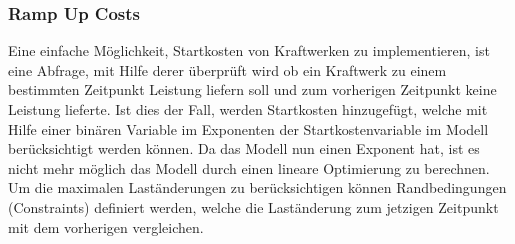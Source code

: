 \documentclass{eegreport}
\begin{document}
\subsubsection{Ramp Up Costs}
Eine einfache Möglichkeit, Startkosten von Kraftwerken zu implementieren, ist eine Abfrage, mit Hilfe derer
überprüft wird ob ein Kraftwerk zu einem bestimmten Zeitpunkt Leistung liefern soll und zum vorherigen
Zeitpunkt keine Leistung lieferte.
Ist dies der Fall, werden Startkosten hinzugefügt, welche mit Hilfe einer binären Variable im Exponenten der
Startkostenvariable im Modell berücksichtigt werden können. Da das Modell nun einen Exponent hat, ist es nicht mehr möglich das Modell durch einen lineare Optimierung zu berechnen.
Um die maximalen Laständerungen zu berücksichtigen können Randbedingungen (Constraints) definiert werden, welche die Laständerung zum jetzigen Zeitpunkt mit dem vorherigen vergleichen.

\appendix


\newpage

\listoffigures   
\listoftables
\end{document}
